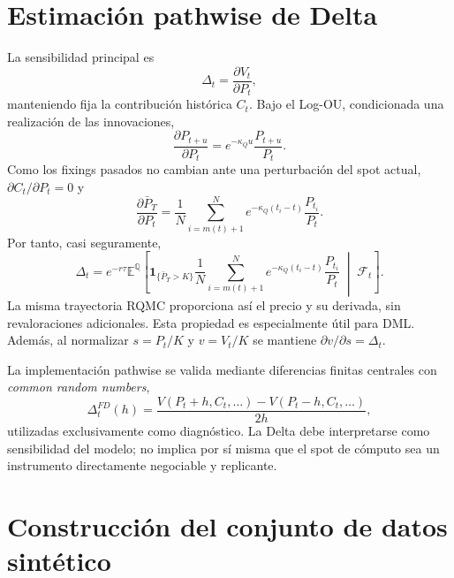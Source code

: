 \section{Estimación pathwise de Delta}
\label{sec:pathwise_delta}

La sensibilidad principal es
\begin{equation}
    \Delta_t=\frac{\partial V_t}{\partial P_t},
    \label{eq:delta_definition}
\end{equation}
manteniendo fija la contribución histórica $C_t$. Bajo el Log-OU,
condicionada una realización de las innovaciones,
\begin{equation}
    \frac{\partial P_{t+u}}{\partial P_t}
    =e^{-\kappa_Q u}\frac{P_{t+u}}{P_t}.
    \label{eq:logou_spot_pathwise}
\end{equation}
Como los fixings pasados no cambian ante una perturbación del spot actual,
$\partial C_t/\partial P_t=0$ y
\begin{equation}
    \frac{\partial\bar P_T}{\partial P_t}
    =\frac{1}{N}\sum_{i=m(t)+1}^{N}
    e^{-\kappa_Q(t_i-t)}\frac{P_{t_i}}{P_t}.
    \label{eq:asian_average_pathwise_derivative}
\end{equation}
Por tanto, casi seguramente,
\begin{equation}
    \Delta_t=e^{-r\tau}\mathbb E^{\mathbb Q}\left[
    \mathbf 1_{\{\bar P_T>K\}}
    \frac{1}{N}\sum_{i=m(t)+1}^{N}
    e^{-\kappa_Q(t_i-t)}\frac{P_{t_i}}{P_t}
    \;\middle|\;\mathcal F_t\right].
    \label{eq:asian_logou_delta}
\end{equation}
La misma trayectoria RQMC proporciona así el precio y su derivada, sin
revaloraciones adicionales. Esta propiedad es especialmente útil para DML.
Además, al normalizar $s=P_t/K$ y $v=V_t/K$ se mantiene
$\partial v/\partial s=\Delta_t$.

La implementación pathwise se valida mediante diferencias finitas centrales con
\textit{common random numbers},
\begin{equation}
    \Delta_t^{FD}(h)=\frac{V(P_t+h,C_t,\ldots)-V(P_t-h,C_t,\ldots)}{2h},
    \label{eq:central_fd_delta}
\end{equation}
utilizadas exclusivamente como diagnóstico. La Delta debe interpretarse como
sensibilidad del modelo; no implica por sí misma que el spot de cómputo sea un
instrumento directamente negociable y replicante.


\section{Construcción del conjunto de datos sintético}
\label{sec:synthetic_dataset}

